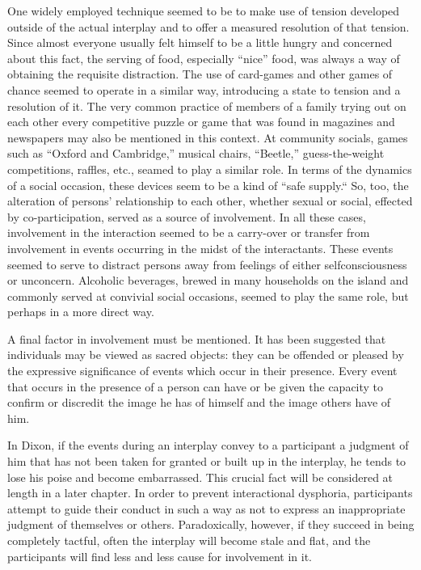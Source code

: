 \documentclass[twoside,symmetric,nobib,justified]{tufte-book}
\begin{document}
One widely employed technique seemed to be to make use of tension
developed outside of the actual interplay and to offer a measured
resolution of that tension. Since almost everyone usually felt himself
to be a little hungry and concerned about this fact, the serving of
food, especially ``nice'' food, was always a way of obtaining the
requisite distraction. The use of card-games and other games of chance
seemed to operate in a similar way, introducing a state to tension and a
resolution of it. The very common practice of members of a family trying
out on each other every competitive puzzle or game that was found in
magazines and newspapers may also be mentioned in this context. At
community socials, games such as ``Oxford and Cambridge,'' musical
chairs, ``Beetle,'' guess-the-weight competitions, raffles, etc., seamed
to play a similar role. In terms of the dynamics of a social occasion,
these devices seem to be a kind of ``safe supply.`` So, too, the
alteration of persons' relationship to each other, whether sexual or
social, effected by co-participation, served as a source of involvement.
In all these cases, involvement in the interaction seemed to be a
carry-over or transfer from involvement in events occurring in the midst
of the interactants. These events seemed to serve to distract persons
away from feelings of either selfconsciousness or unconcern. Alcoholic
beverages, brewed in many households on the island and commonly served
at convivial social occasions, seemed to play the same role, but perhaps
in a more direct way.

A final factor in involvement must be mentioned. It has been suggested
that individuals may be viewed as sacred objects: they can be offended
or pleased by the expressive significance of events which occur in their
presence. Every event that occurs in the presence of a person can have
or be given the capacity to confirm or discredit the image he has of
himself and the image others have of him.

In Dixon, if the events during an interplay convey to a participant a
judgment of him that has not been taken for granted or built up in the
interplay, he tends to lose his poise and become embarrassed. This
crucial fact will be considered at length in a later chapter. In order
to prevent interactional dysphoria, participants attempt to guide their
conduct in such a way as not to express an inappropriate judgment of
themselves or others. Paradoxically, however, if they succeed in being
completely tactful, often the interplay will become stale and flat, and
the participants will find less and less cause for involvement in it.
\end{document}
